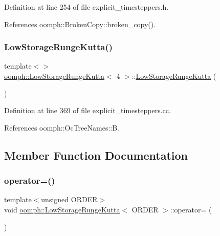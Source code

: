 Definition at line 254 of file explicit\+\_\+timesteppers.\+h.



References oomph\+::\+Broken\+Copy\+::broken\+\_\+copy().

\mbox{\label{classoomph_1_1LowStorageRungeKutta_a2013130cde2ea8819c3bc2ce7b6807ed}} 
\subsubsection{\texorpdfstring{Low\+Storage\+Runge\+Kutta()}{LowStorageRungeKutta()}\hspace{0.1cm}{\footnotesize\ttfamily [3/3]}}
{\footnotesize\ttfamily template$<$$>$ \\
\hyperlink{classoomph_1_1LowStorageRungeKutta}{oomph\+::\+Low\+Storage\+Runge\+Kutta}$<$ 4 $>$\+::\hyperlink{classoomph_1_1LowStorageRungeKutta}{Low\+Storage\+Runge\+Kutta} (\begin{DoxyParamCaption}{ }\end{DoxyParamCaption})}



Definition at line 369 of file explicit\+\_\+timesteppers.\+cc.



References oomph\+::\+Oc\+Tree\+Names\+::B.



\subsection{Member Function Documentation}
\mbox{\label{classoomph_1_1LowStorageRungeKutta_a4c684b9403d27e2f03cd272e584ff923}} 
\subsubsection{\texorpdfstring{operator=()}{operator=()}}
{\footnotesize\ttfamily template$<$unsigned O\+R\+D\+ER$>$ \\
void \hyperlink{classoomph_1_1LowStorageRungeKutta}{oomph\+::\+Low\+Storage\+Runge\+Kutta}$<$ O\+R\+D\+ER $>$\+::operator= (\begin{DoxyParamCaption}\item[{const \hyperlink{classoomph_1_1LowStorageRungeKutta}{Low\+Storage\+Runge\+Kutta}$<$ O\+R\+D\+ER $>$ \&}]{ }\end{DoxyParamCaption})\hspace{0.3cm}{\ttfamily [inline]}}



